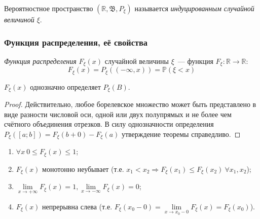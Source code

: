 \begin{defn}
    Вероятностное пространство $(\mathbb{R}, \mathfrak{B}, P_\xi)$ называется {\it индуцированным случайной величиной $\xi$}.
\end{defn}

\subsubsection{Функция распределения, её свойства}
\begin{defn}
    {\it Функция распределения} $F_\xi (x)$ случайной величины $\xi$~--- функция $F_\xi: \mathbb{R} \rightarrow \mathbb{R}$:
    \begin{equation*}
        F_{\xi}(x)=P_{\xi}((-\infty, x))=\mathbb{P}(\xi<x)
    \end{equation*}
\end{defn}

\begin{thm*}
    $F_\xi(x)$ однозначно определяет $P_\xi(B)$.
\end{thm*}
\begin{proof}
    Действительно, любое борелевское множество может быть представлено в виде разности числовой оси, одной или двух полупрямых и не более чем счётного объединения отрезков. В силу однозначности определения $P_\xi([a;b]) = F_\xi(b + 0) - F_\xi(a)$ утверждение теоремы справедливо.
\end{proof}

\begin{namedthm}\leavevmode
\begin{enumerate}
    \item $\forall x~ 0 \leqslant F_\xi(x) \leqslant 1$;
    \item $F_\xi(x)$ монотонно неубывает (т.е. $x_1 < x_2 \Rightarrow F_\xi(x_1) \leqslant F_\xi(x_2)~ \forall x_1, x_2$);
    \item $\lim\limits_{x \rightarrow +\infty} F_\xi(x) = 1, \lim\limits_{x \rightarrow -\infty} F_\xi(x) = 0$;
    \item $F_\xi(x)$ непрерывна слева (т.е. $F_\xi(x_0 - 0) = \lim\limits_{x \rightarrow x_0 - 0}F_\xi(x) = F_\xi(x_0)$).
\end{enumerate}
\end{namedthm}

